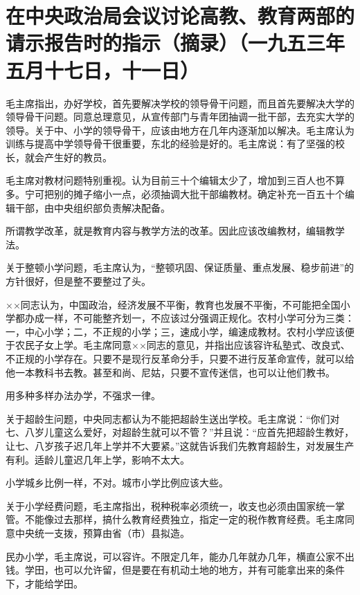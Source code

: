 \section[在中央政治局会议讨论高教、教育两部的请示报告时的指示（摘录）（一九五三年五月十七日，十一日）]{在中央政治局会议讨论高教、教育两部的请示报告时的指示（摘录）（一九五三年五月十七日，十一日）}


毛主席指出，办好学校，首先要解决学校的领导骨干问题，而且首先要解决大学的领导骨干问题。同意总理意见，从宣传部门与青年团抽调一批干部，去充实大学的领导。关于中、小学的领导骨干，应该由地方在几年内逐渐加以解决。毛主席认为训练与提高中学领导骨干很重要，东北的经验是好的。毛主席说：有了坚强的校长，就会产生好的教员。

毛主席对教材问题特别重视。认为目前三十个编辑太少了，增加到三百人也不算多。宁可把别的摊子缩小一点，必须抽调大批干部编教材。确定补充一百五十个编辑干部，由中央组织部负责解决配备。

所谓教学改革，就是教育内容与教学方法的改革。因此应该改编教材，编辑教学法。

关于整顿小学问题，毛主席认为，“整顿巩固、保证质量、重点发展、稳步前进”的方针很好，但是整不要整过了头。

××同志认为，中国政治，经济发展不平衡，教育也发展不平衡，不可能把全国小学都办成一样，不可能整齐划一，不应该过分强调正规化。农村小学可分为三类：一，中心小学；二，不正规的小学；三，速成小学，编速成教材。农村小学应该便于农民子女上学。毛主席同意××同志的意见，并指出应该容许私塾式、改良式、不正规的小学存在。只要不是现行反革命分手，只要不进行反革命宣传，就可以给他一本教科书去教。甚至和尚、尼姑，只要不宣传迷信，也可以让他们教书。

用多种多样办法办学，不强求一律。

关于超龄生问题，中央同志都认为不能把超龄生送出学校。毛主席说：“你们对七、八岁儿童这么爱好，对超龄生就可以不管？”并且说：“应首先把超龄生教好，让七、八岁孩子迟几年上学并不大要紧。”这就告诉我们先教育超龄生，对发展生产有利。适龄儿童迟几年上学，影响不太大。

小学城乡比例一样，不对。城市小学比例应该大些。

关于小学经费问题，毛主席指出，税种税率必须统一，收支也必须由国家统一掌管。不能像过去那样，搞什么教育经费独立，指定一定的税作教育经费。毛主席同意中央统一支拨，预算由省（市）县拟造。

民办小学，毛主席说，可以容许。不限定几年，能办几年就办几年，横直公家不出钱。学田，也可以允许留，但是要在有机动土地的地方，并有可能拿出来的条件下，才能给学田。

